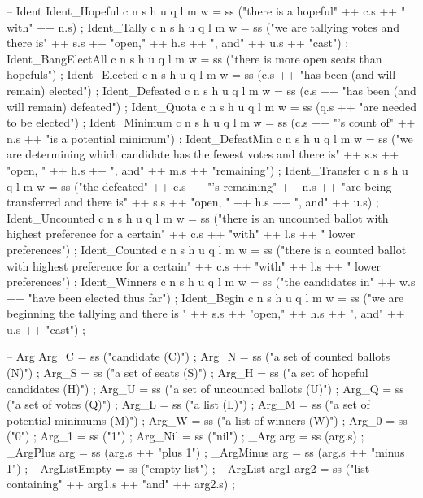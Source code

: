 \begin{lstgf}
{        -- Ident
        Ident_Hopeful c n s h u q l m w
            = ss ("there is a hopeful" ++ c.s ++ " with" ++ n.s) ;
        Ident_Tally c n s h u q l m w
            = ss ("we are tallying votes and there is" ++ s.s ++ "open," ++ h.s ++ ", and" ++ u.s ++ "cast") ;
        Ident_BangElectAll c n s h u q l m w
            = ss ("there is more open seats than hopefuls") ;
        Ident_Elected c n s h u q l m w
            = ss (c.s ++ "has been (and will remain) elected") ;
        Ident_Defeated c n s h u q l m w
            = ss (c.s ++ "has been (and will remain) defeated") ;
        Ident_Quota c n s h u q l m w
            = ss (q.s ++ "are needed to be elected") ;
        Ident_Minimum c n s h u q l m w
            = ss (c.s ++ "'s count of" ++ n.s ++ "is a potential minimum") ;
        Ident_DefeatMin c n s h u q l m w
            = ss ("we are determining which candidate has the fewest votes and there is" ++ s.s ++ "open, " 
		     ++ h.s ++ ", and" ++ m.s ++ "remaining") ;
        Ident_Transfer c n s h u q l m w
            = ss ("the defeated" ++ c.s ++"'s remaining" ++ n.s ++ "are being transferred and there is" ++ 
		     s.s ++ "open, " ++ h.s ++ ", and" ++ u.s) ;
        Ident_Uncounted c n s h u q l m w
            = ss ("there is an uncounted ballot with highest preference for a certain" ++ c.s ++ "with" ++ l.s ++ 
		     " lower preferences") ;
        Ident_Counted c n s h u q l m w
            = ss ("there is a counted ballot with highest preference for a certain" ++ c.s ++ "with" ++ l.s ++ 
		     " lower preferences") ;
        Ident_Winners c n s h u q l m w
            = ss ("the candidates in" ++ w.s ++ "have been elected thus far") ;
        Ident_Begin c n s h u q l m w
            = ss ("we are beginning the tallying and there is " ++ s.s ++ "open," ++ h.s ++ ", and" ++ u.s ++ "cast") ;

        -- Arg
        Arg_C                           = ss ("candidate (C)") ;
        Arg_N                           = ss ("a set of counted ballots (N)") ;
        Arg_S                           = ss ("a set of seats (S)") ;
        Arg_H                           = ss ("a set of hopeful candidates (H)") ;
        Arg_U                           = ss ("a set of uncounted ballots (U)") ;
        Arg_Q                           = ss ("a set of votes (Q)") ;
        Arg_L                           = ss ("a list (L)") ;
        Arg_M                           = ss ("a set of potential minimums (M)") ;
        Arg_W                           = ss ("a list of winners (W)") ;
        Arg_0                           = ss ("0") ;
        Arg_1                           = ss ("1") ;
        Arg_Nil                         = ss ("nil") ;
        _Arg arg                        = ss (arg.s) ;
        _ArgPlus arg                    = ss (arg.s ++ "plus 1") ;
        _ArgMinus arg                   = ss (arg.s ++ "minus 1") ;
        _ArgListEmpty                   = ss ("empty list") ;
        _ArgList arg1 arg2              = ss ("list containing" ++ arg1.s ++ "and" ++ arg2.s) ;
        
}
\end{lstgf}
